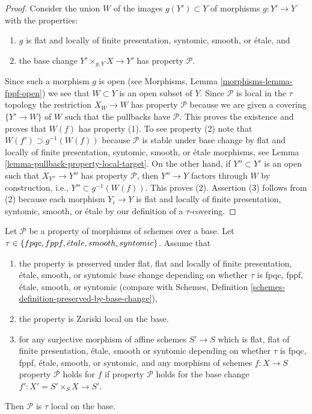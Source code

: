 \begin{proof}
Consider the union $W$ of the images $g(Y') \subset Y$ of
morphisms $g : Y' \to Y$ with the properties:
\begin{enumerate}
\item $g$ is flat and locally of finite presentation, syntomic,
smooth, or \'etale, and
\item the base change $Y' \times_{g, Y} X \to Y'$ has property
$\mathcal{P}$.
\end{enumerate}
Since such a morphism $g$ is open (see
Morphisms, Lemma \ref{morphisms-lemma-fppf-open})
we see that $W \subset Y$ is an open subset of $Y$. Since $\mathcal{P}$
is local in the $\tau$ topology the restriction $X_W \to W$ has property
$\mathcal{P}$ because we are given a covering $\{Y' \to W\}$ of $W$ such that
the pullbacks have $\mathcal{P}$. This proves the existence and proves
that $W(f)$ has property (1). To see property (2) note that
$W(f') \supset g^{-1}(W(f))$ because $\mathcal{P}$ is stable under
base change by flat and locally of finite presentation,
syntomic, smooth, or \'etale morphisms, see
Lemma \ref{lemma-pullback-property-local-target}.
On the other hand, if $Y'' \subset Y'$ is an open such that
$X_{Y''} \to Y''$ has property $\mathcal{P}$, then $Y'' \to Y$ factors
through $W$ by construction, i.e., $Y'' \subset g^{-1}(W(f))$. This
proves (2). Assertion (3) follows from (2) because each morphism
$Y_i \to Y$ is flat and locally of finite presentation, syntomic,
smooth, or \'etale by our definition of a $\tau$-covering.
\end{proof}

\begin{lemma}
\label{lemma-descending-properties-morphisms}
Let $\mathcal{P}$ be a property of morphisms of schemes over a base.
Let $\tau \in \{fpqc, fppf, {\acute{e}tale}, smooth, syntomic\}$.
Assume that
\begin{enumerate}
\item the property is preserved under
flat, flat and locally of finite presentation, \'etale, smooth, or syntomic
base change depending on whether $\tau$ is fpqc, fppf, \'etale, smooth, or
syntomic (compare with
Schemes, Definition \ref{schemes-definition-preserved-by-base-change}),
\item the property is Zariski local on the base.
\item for any surjective morphism of affine schemes $S' \to S$
which is flat, flat of finite presentation,
\'etale, smooth or syntomic depending on whether $\tau$ is
fpqc, fppf, \'etale, smooth, or syntomic,
and any morphism of schemes $f : X \to S$ property
$\mathcal{P}$ holds for $f$ if property $\mathcal{P}$
holds for the base change $f' : X' = S' \times_S X \to S'$.
\end{enumerate}
Then $\mathcal{P}$ is $\tau$ local on the base.
\end{lemma}

